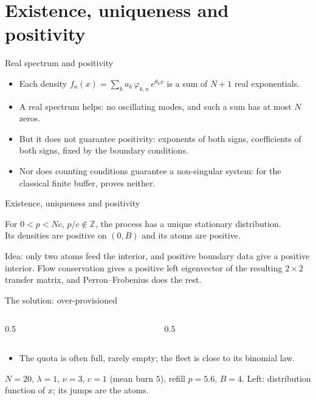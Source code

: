 \documentclass[aspectratio=169]{beamer}
\renewcommand{\cite}{\citep}
\renewcommand{\phi}{\varphi}
\newenvironment*{myitem}[1][1.5em]{\begin{itemize}\setlength{\itemsep}{#1}}{\end{itemize}}
\begin{document}
\section{Existence, uniqueness and positivity}

\begin{frame}{Real spectrum and positivity}

	\begin{myitem}
		\item Each density $f_n(x)=\sum_k a_k\,\phi_{k,n}\,e^{\theta_k x}$ is a sum of $N+1$ \alert{real} exponentials.
		\item A real spectrum \alert{helps}: no oscillating modes, and such a sum has at most $N$ zeros.
		\pause
		\item But it does \alert{not guarantee} positivity: exponents of both signs, coefficients of both signs, fixed by the boundary conditions.
		\item Nor does counting conditions guarantee a \alert{non-singular} system: for the classical finite buffer, \cite{Mitra1988} proves neither.
	\end{myitem}
\end{frame}

\begin{frame}{Existence, uniqueness and positivity}

	\begin{theorem}
		For $0<p<Nc$, $p/c\notin\mathbb Z$, the process has a \alert{unique} stationary distribution.\\
		Its densities are positive on $(0,B)$ and its atoms are positive.
	\end{theorem}

	\vfill

	{\footnotesize Idea: only two atoms feed the interior, and positive boundary data give a positive interior. Flow conservation gives a positive left eigenvector of the resulting $2\times2$ transfer matrix, and Perron--Frobenius does the rest.}
\end{frame}

\begin{frame}{The solution: over-provisioned}

	\begin{columns}
		\begin{column}{0.5\textwidth}
			
		\end{column}
		\begin{column}{0.5\textwidth}
			
		\end{column}
	\end{columns}

	\medskip
	\begin{myitem}[0.5em]
		\item The quota is often \alert{full}, rarely empty; the fleet is close to its binomial law.
	\end{myitem}
	{\footnotesize $N=20$, $\lambda=1$, $\nu=3$, $c=1$ (mean burn $5$), refill $p=5.6$, $B=4$. Left: distribution function of $x$; its jumps are the atoms.}
\end{frame}
\end{document}

